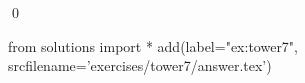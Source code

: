 
\begin{ex} 
  \label{ex:tower7}
  
  \qed
\end{ex} 
\begin{python0}
from solutions import *
add(label="ex:tower7",
    srcfilename='exercises/tower7/answer.tex') 
\end{python0}
